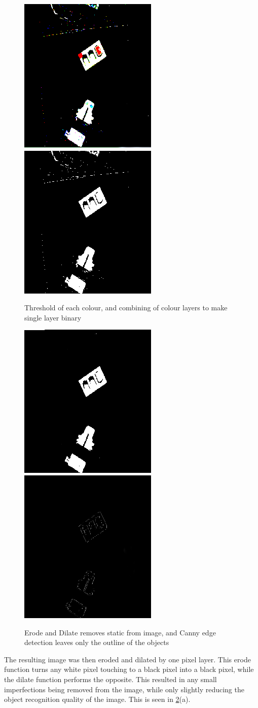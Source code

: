 \documentclass[11pt,a4paper]{report}
\begin{document}
\begin{figure}\centering
\includegraphics[width=0.3\linewidth]{out1} %
\includegraphics[width=0.3\linewidth]{out2}
\caption{Threshold of each colour, and combining of colour layers to make single layer binary}
\label{fig:out2}
\end{figure}
\begin{figure}
	\centering
	\includegraphics[width=0.3\linewidth]{out4}
	\includegraphics[width=0.3\linewidth]{out3}
	\caption{Erode and Dilate removes static from image, and Canny edge detection leaves only the outline of the objects }
	\label{fig:out4}
\end{figure}

The resulting image was then eroded and dilated by one pixel layer. This erode function turns any white pixel touching to a black pixel into a black pixel, while the dilate function performs the opposite. This resulted in any small imperfections being removed from the image, while only slightly reducing the object recognition quality of the image. This is seen in \cref{fig:out4}(a).
\end{document}
